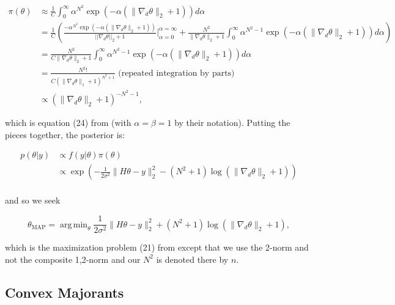 \documentclass[paper=a4, fontsize=11pt]{scrartcl} %
\DeclareMathOperator*{\argmin}{arg\,min}
\numberwithin{equation}{section} %
\numberwithin{figure}{section} %
\numberwithin{table}{section} %
\newcommand{\grad}{\nabla_{d} }
\begin{document}
\begin{align*}
  \pi (\theta) &\approx \frac{1}{C} \int_{0}^{\infty} \alpha^{N^2 } \exp( -\alpha (\|\grad\theta\|_2 + 1)) d\alpha \\
  &= \frac{1}{C} \left (
  \frac{-\alpha^{N^2} \exp(-\alpha (\|\grad\theta\|_2 + 1))}{||\grad\theta||_2 + 1} \bigg |_{\alpha=0}^{\alpha=\infty}
  +\frac{N^2}{\|\grad\theta\|_2 + 1}\int_{0}^{\infty} \alpha^{N^2-1} \exp( -\alpha (\|\grad\theta\|_2 + 1)) d\alpha \right ) \\
  &= \frac{N^2}{C\|\grad\theta\|_2 + 1}\int_{0}^{\infty} \alpha^{N^2-1} \exp( -\alpha (\|\grad\theta\|_2 + 1)) d\alpha \\
  &= \frac{ N^2!}{ C(\|\grad\theta\|_1 + 1)^{N^2+1}} \text{ (repeated integration by parts)}\\
  &\propto (\|\grad\theta\|_2 + 1)^{-N^2-1},
\end{align*}

which is equation (24) from \cite{oliveira2009adaptive} (with $\alpha
= \beta = 1$ by their notation). Putting the pieces together, the
posterior is:

\begin{align*}
  p(\theta | y ) &\propto f(y | \theta ) \pi(\theta ) \\
  &\propto \exp \left ( -\frac{1}{2\sigma^2} \|H\theta - y\|_2^2 - (N^2 + 1) \log (\|\grad\theta\|_2 + 1) \right ) \\
\end{align*}
 
and so we seek

\begin{equation*}
\theta_{\text{MAP}} = \argmin_{\theta} \frac{1}{2\sigma^2} \|H\theta - y\|_2^2 + (N^2 + 1) \log (\|\grad\theta\|_2 + 1),
\end{equation*}

which is the maximization problem (21) from \cite{green2015bayesian}
except that we use the 2-norm and not the composite 1,2-norm and our
$N^2$ is denoted there by $n$.

\subsection{Convex Majorants}\label{subsec:MM}
\end{document}
